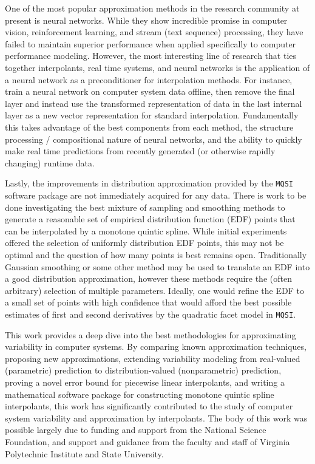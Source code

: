 One of the most popular approximation methods in the research community at present is neural networks. While they show incredible promise in computer vision, reinforcement learning, and stream (text sequence) processing, they have failed to maintain superior performance when applied specifically to computer performance modeling. However, the most interesting line of research that ties together interpolants, real time systems, and neural networks is the application of a neural network as a preconditioner for interpolation methods. For instance, train a neural network on computer system data offline, then remove the final layer and instead use the transformed representation of data in the last internal layer as a new vector representation for standard interpolation. Fundamentally this takes advantage of the best components from each method, the structure processing / compositional nature of neural networks, and the ability to quickly make real time predictions from recently generated (or otherwise rapidly changing) runtime data.

Lastly, the improvements in distribution approximation provided by the \texttt{MQSI} software package are not immediately acquired for any data. There is work to be done investigating the best mixture of sampling and smoothing methods to generate a reasonable set of empirical distribution function (EDF) points that can be interpolated by a monotone quintic spline. While initial experiments offered the selection of uniformly distribution EDF points, this may not be optimal and the question of how many points is best remains open. Traditionally Gaussian smoothing or some other method may be used to translate an EDF into a good distribution approximation, however these methods require the (often arbitrary) selection of multiple parameters. Ideally, one would refine the EDF to a small set of points with high confidence that would afford the best possible estimates of first and second derivatives by the quadratic facet model in \texttt{MQSI}.

This work provides a deep dive into the best methodologies for approximating variability in computer systems. By comparing known approximation techniques, proposing new approximations, extending variability modeling from real-valued (parametric) prediction to distribution-valued (nonparametric) prediction, proving a novel error bound for piecewise linear interpolants, and writing a mathematical software package for constructing monotone quintic spline interpolants, this work has significantly contributed to the study of computer system variability and approximation by interpolants. The body of this work was possible largely due to funding and support from the National Science Foundation, and support and guidance from the faculty and staff of Virginia Polytechnic Institute and State University.

